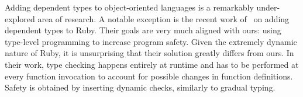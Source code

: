 Adding dependent types to object-oriented languages is a remarkably under-explored area of research.
A notable exception is the recent work of~\cite{kazerounian2019type} on adding dependent types to Ruby.
Their goals are very much aligned with ours: using type-level programming to increase program safety.
Given the extremely dynamic nature of Ruby, it is unsurprising that their solution greatly differs from ours.
In their work, type checking happens entirely at runtime and has to be performed at every function invocation to account for possible changes in function definitions.
Safety is obtained by inserting dynamic checks, similarly to gradual typing.

